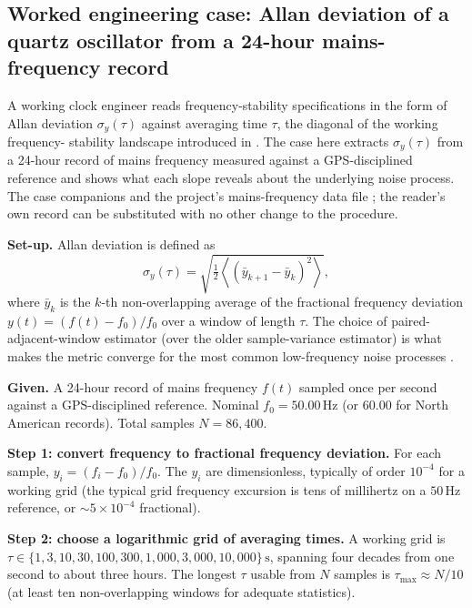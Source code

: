 \subsection{Worked engineering case: Allan deviation of a quartz
oscillator from a 24-hour mains-frequency record}

A working clock engineer reads frequency-stability specifications
in the form of Allan deviation $\sigma_{y}(\tau)$ against
averaging time $\tau$, the diagonal of the working frequency-
stability landscape introduced in
\cite{paper:ch05-allan-1966}. The case here extracts
$\sigma_{y}(\tau)$ from a 24-hour record of mains frequency
measured against a GPS-disciplined reference and shows what each
slope reveals about the underlying noise process. The case
companions  and the
project's mains-frequency data file
; the reader's own record
can be substituted with no other change to the procedure.

\textbf{Set-up.} Allan deviation is defined as
\[
\sigma_{y}(\tau) = \sqrt{\tfrac{1}{2}\left\langle (\bar y_{k+1} -
\bar y_{k})^{2} \right\rangle},
\]
where $\bar y_{k}$ is the $k$-th non-overlapping average of the
fractional frequency deviation $y(t) = (f(t) - f_{0})/f_{0}$ over
a window of length $\tau$. The choice of paired-adjacent-window
estimator (over the older sample-variance estimator) is what
makes the metric converge for the most common low-frequency noise
processes \cite{paper:ch06-allan-1966}.

\textbf{Given.} A 24-hour record of mains frequency $f(t)$ sampled
once per second against a GPS-disciplined reference. Nominal
$f_{0} = 50.00 \,\si{\hertz}$ (or $60.00$ for North American
records). Total samples $N = 86{,}400$.

\textbf{Step 1: convert frequency to fractional frequency
deviation.} For each sample, $y_{i} = (f_{i} - f_{0})/f_{0}$. The
$y_{i}$ are dimensionless, typically of order $10^{-4}$ for a
working grid (the typical grid frequency excursion is tens of
millihertz on a $50 \,\si{\hertz}$ reference, or $\sim 5 \times
10^{-4}$ fractional).

\textbf{Step 2: choose a logarithmic grid of averaging times.}
A working grid is $\tau \in \{1, 3, 10, 30, 100, 300, 1{,}000,
3{,}000, 10{,}000\} \,\si{\second}$, spanning four decades from
one second to about three hours. The longest $\tau$ usable from
$N$ samples is $\tau_{\text{max}} \approx N/10$ (at least ten
non-overlapping windows for adequate statistics).

